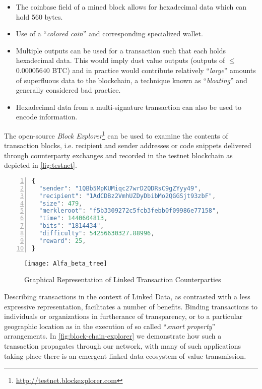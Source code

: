 \begin{itemize}
    \item The coinbase field of a mined block allows for hexadecimal data which can hold 560 bytes.
    
    \item Use of a ``\textit{colored coin}'' and corresponding specialized wallet.
    
    \item Multiple outputs can be used for a transaction such that each holds hexadecimal data. This would imply dust value outputs (outputs of $\leqslant{}$ 0.00005640 BTC) and in practice would contribute relatively ``\textit{large}'' amounts of superfluous data to the blockchain, a technique known as ``\textit{bloating}'' and generally considered bad practice.
    
    \item Hexadecimal data from a multi-signature transaction can also be used to encode information.
\end{itemize}

The open-source \textit{Block Explorer}\footnote{\footnotesize{\url{http://testnet.blockexplorer.com}}} can be used to examine the contents of transaction blocks, i.e. recipient and sender addresses or code snippets delivered through counterparty exchanges and recorded in the testnet blockchain as depicted in \autoref{fig:testnet}.  


\begin{lstlisting}[label=fig:testnet,caption=Testnet Output Specifying Counterparties,language=Javascript,basicstyle=\scriptsize \ttfamily,numbers=left,numberstyle=\tiny\color{mygray}]
{
  "sender": "1QBb5MpKUMiqc27wrD2QDRsC9gZYyy49",
  "recipient": "1AdCDBz2VmhUZDyDbibMo2QGGSjt93zbF",
  "size": 479,
  "merkleroot": "f5b3309272c5fcb3febb0f09986e77158",
  "time": 1440604813,
  "bits": "1814434",
  "difficulty": 54256630327.88996,
  "reward": 25,
}
\end{lstlisting}


\begin{figure}[tb]
   \center 
   \texttt{[image: Alfa\_beta\_tree]}
   \caption{Graphical Representation of Linked Transaction Counterparties} 
   \label{fig:block-chain-explorer}
\end{figure} 


Describing transactions in the context of Linked Data, as contrasted with a less expressive representation, facilitates a number of benefits. Binding transactions to individuals or organizations in furtherance of transparency, or to a particular geographic location as in the execution of so called ``\textit{smart property}'' arrangements. 
In \autoref{fig:block-chain-explorer} we demonstrate how such a transaction propagates through our network, with many of such applications taking place there is an emergent linked data ecosystem of value transmission.


